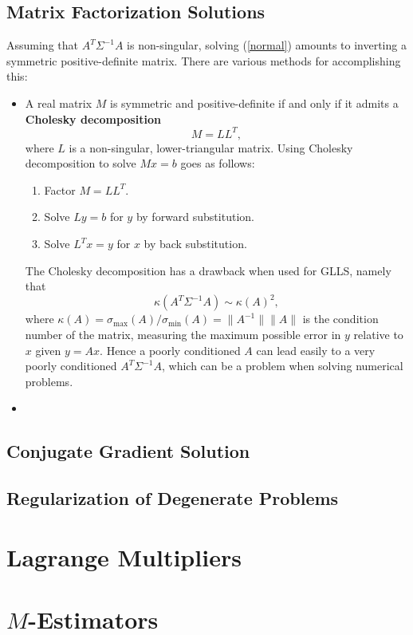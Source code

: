 \documentclass{amsart}
\begin{document}
\subsection{Matrix Factorization Solutions}
Assuming that $A^T \Sigma^{-1} A$ is non-singular, solving (\ref{normal}) amounts to inverting a
symmetric positive-definite matrix. There are various methods for accomplishing this:
\begin{itemize}
    \item A real matrix $M$ is symmetric and positive-definite if and only if it admits
    a \textbf{Cholesky decomposition}
    $$
    M = LL^T,
    $$
    where $L$ is a non-singular, lower-triangular matrix. Using Cholesky decomposition to solve
    $Mx = b$ goes as follows:
    \begin{enumerate}
        \item Factor $M = LL^T$.
        \item Solve $Ly = b$ for $y$ by forward substitution.
        \item Solve $L^Tx = y$ for $x$ by back substitution.
    \end{enumerate}
    The Cholesky decomposition has a drawback when used for GLLS, namely that
    $$
    \kappa(A^T \Sigma^{-1} A) \sim \kappa(A)^2,
    $$
    where $\kappa(A) = \sigma_{\max}(A) / \sigma_{\min}(A) = \| A^{-1}\| \|A\|$ is the condition
    number of the matrix, measuring the maximum possible error in $y$ relative to $x$ given
    $y = Ax$. Hence
    a poorly conditioned $A$ can lead easily to a very poorly conditioned $A^T \Sigma^{-1} A$, which
    can be a problem when solving numerical problems.

    \item 
\end{itemize}

\subsection{Conjugate Gradient Solution}
\subsection{Regularization of Degenerate Problems}

\section{Lagrange Multipliers}

\section {$M$-Estimators}
\end{document}
